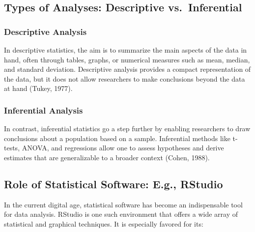 \documentclass[
  b5paper]{book}
\begin{document}
\hypertarget{types-of-analyses-descriptive-vs.-inferential}{%
\subsection{Types of Analyses: Descriptive vs.~Inferential}\label{types-of-analyses-descriptive-vs.-inferential}}

\hypertarget{descriptive-analysis}{%
\subsubsection{Descriptive Analysis}\label{descriptive-analysis}}

In descriptive statistics, the aim is to summarize the main aspects of the data in hand, often through tables, graphs, or numerical measures such as mean, median, and standard deviation. Descriptive analysis provides a compact representation of the data, but it does not allow researchers to make conclusions beyond the data at hand (Tukey, 1977).

\hypertarget{inferential-analysis}{%
\subsubsection{Inferential Analysis}\label{inferential-analysis}}

In contrast, inferential statistics go a step further by enabling researchers to draw conclusions about a population based on a sample. Inferential methods like t-tests, ANOVA, and regressions allow one to assess hypotheses and derive estimates that are generalizable to a broader context (Cohen, 1988).

\hypertarget{role-of-statistical-software-e.g.-rstudio}{%
\subsection{Role of Statistical Software: E.g., RStudio}\label{role-of-statistical-software-e.g.-rstudio}}

In the current digital age, statistical software has become an indispensable tool for data analysis. RStudio is one such environment that offers a wide array of statistical and graphical techniques. It is especially favored for its:
\end{document}
